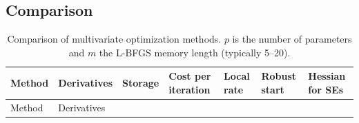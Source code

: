 \documentclass[
  letterpaper,
  DIV=11,
  numbers=noendperiod]{scrreprt}
\begin{document}
\subsection{Comparison}\label{comparison}

\begin{longtable}[]{@{}
  >{\raggedright\arraybackslash}p{}
  >{\raggedright\arraybackslash}p{}
  >{\raggedright\arraybackslash}p{}
  >{\raggedright\arraybackslash}p{}
  >{\raggedright\arraybackslash}p{}
  >{\raggedright\arraybackslash}p{}
  >{\raggedright\arraybackslash}p{}@{}}
\caption{Comparison of multivariate optimization methods. \(p\) is the
number of parameters and \(m\) the L-BFGS memory length (typically
5--20).}\label{tbl-comparison}\tabularnewline
\toprule\noalign{}
\begin{minipage}[b]{\linewidth}\raggedright
Method
\end{minipage} & \begin{minipage}[b]{\linewidth}\raggedright
Derivatives
\end{minipage} & \begin{minipage}[b]{\linewidth}\raggedright
Storage
\end{minipage} & \begin{minipage}[b]{\linewidth}\raggedright
Cost per iteration
\end{minipage} & \begin{minipage}[b]{\linewidth}\raggedright
Local rate
\end{minipage} & \begin{minipage}[b]{\linewidth}\raggedright
Robust start
\end{minipage} & \begin{minipage}[b]{\linewidth}\raggedright
Hessian for SEs
\end{minipage} \\
\midrule\noalign{}
\endfirsthead
\toprule\noalign{}
\begin{minipage}[b]{\linewidth}\raggedright
Method
\end{minipage} & \begin{minipage}[b]{\linewidth}\raggedright
Derivatives
\end{minipage} & \begin{minipage}[b]{\linewidth}\raggedright

\end{minipage}
\end{longtable}
\end{document}
